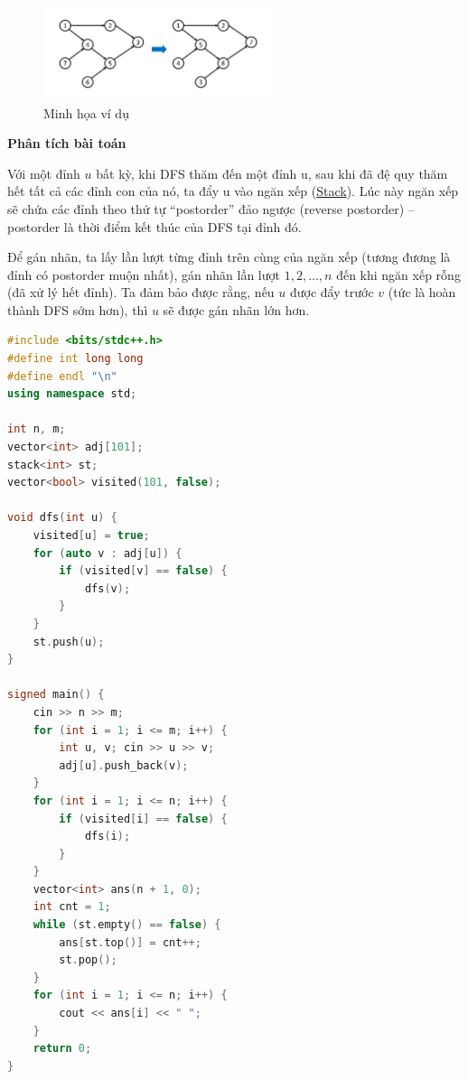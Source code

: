\documentclass{article}
\begin{document}
\begin{figure}[H]
    \centering
    \includegraphics[width=0.6\textwidth]{img/b2/topological_sort_img3.png}
    \caption{Minh họa ví dụ}
\end{figure}

\textbf{Phân tích bài toán}

Với một đỉnh $u$ bất kỳ, khi DFS thăm đến một đỉnh u, sau khi đã đệ quy thăm hết tất cả các đỉnh con của nó, ta đẩy u vào ngăn xếp (\href{https://wiki.vnoi.info/algo/data-structures/Stack}{Stack}). Lúc này ngăn xếp sẽ chứa các đỉnh theo thứ tự ``postorder'' đảo ngược (reverse postorder) -- postorder là thời điểm kết thúc của DFS tại đỉnh đó. 

Để gán nhãn, ta lấy lần lượt từng đỉnh trên cùng của ngăn xếp (tương đương là đỉnh có postorder muộn nhất), gán nhãn lần lượt $1, 2, \dots, n$ đến khi ngăn xếp rỗng (đã xử lý hết đỉnh). Ta đảm bảo được rằng, nếu $u$ được đẩy trước $v$ (tức là hoàn thành DFS sớm hơn), thì $u$ sẽ được gán nhãn lớn hơn.

\begin{lstlisting}[language=C++, caption={Cài đặt Sắp xếp Tô-pô bằng DFS}, label={code:toposort}]
    #include <bits/stdc++.h>
#define int long long
#define endl "\n"
using namespace std;

int n, m;
vector<int> adj[101];
stack<int> st;
vector<bool> visited(101, false);

void dfs(int u) {
    visited[u] = true;
    for (auto v : adj[u]) {
        if (visited[v] == false) {
            dfs(v);
        }
    }
    st.push(u);
}

signed main() {
    cin >> n >> m;
    for (int i = 1; i <= m; i++) {
        int u, v; cin >> u >> v;
        adj[u].push_back(v);
    }    
    for (int i = 1; i <= n; i++) {
        if (visited[i] == false) {
            dfs(i);
        }
    }
    vector<int> ans(n + 1, 0);
    int cnt = 1;
    while (st.empty() == false) {
        ans[st.top()] = cnt++;
        st.pop();
    }
    for (int i = 1; i <= n; i++) {
        cout << ans[i] << " ";
    }
    return 0;
}

\end{lstlisting}
\end{document}
